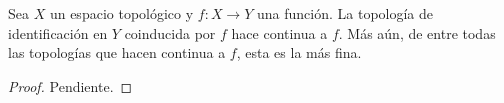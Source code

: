 

\begin{proposition}
Sea $X$ un espacio topológico y $f : X \longrightarrow Y$ una función. La topología de identificación en $Y$ coinducida por $f$ hace continua a $f$. Más aún, de entre todas las topologías que hacen continua a $f$, esta es la más fina.
\end{proposition}

\begin{proof}
Pendiente.
\end{proof}
